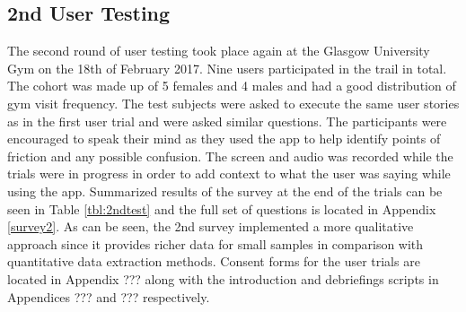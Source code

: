 \documentclass{l4proj}
\begin{document}
\subsection{2nd User Testing}
The second round of user testing took place again at the Glasgow University Gym on the 18th of February 2017. Nine users participated in the trail in total. The cohort was made up of 5 females and 4 males and had a good distribution of gym visit frequency. The test subjects were asked to execute the same user stories as in the first user trial and were asked similar questions. The participants were encouraged to speak their mind as they used the app to help identify points of friction and any possible confusion. The screen and audio was recorded while the trials were in progress in order to add context to what the user was saying while using the app. Summarized results of the survey at the end of the trials can be seen in Table \ref{tbl:2ndtest} and the full set of questions is located in Appendix \ref{survey2}. As can be seen, the 2nd survey implemented a more qualitative approach since it provides richer data for small samples in comparison with quantitative data extraction methods. Consent forms for the user trials are located in Appendix ??? along with the introduction and debriefings scripts in Appendices ??? and ??? respectively. 
\end{document}
